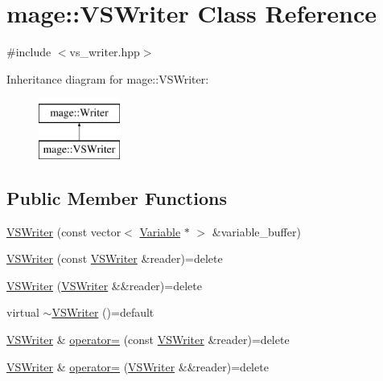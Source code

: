 \hypertarget{classmage_1_1_v_s_writer}{}\section{mage\+:\+:V\+S\+Writer Class Reference}
\label{classmage_1_1_v_s_writer}


{\ttfamily \#include $<$vs\+\_\+writer.\+hpp$>$}

Inheritance diagram for mage\+:\+:V\+S\+Writer\+:\begin{figure}[H]
\begin{center}
\leavevmode
\includegraphics[height=2.000000cm]{classmage_1_1_v_s_writer}
\end{center}
\end{figure}
\subsection*{Public Member Functions}
\begin{DoxyCompactItemize}
\item 
\hyperlink{classmage_1_1_v_s_writer_a401e3661cf197c20a011792221443e8f}{V\+S\+Writer} (const vector$<$ \hyperlink{structmage_1_1_variable}{Variable} $\ast$ $>$ \&variable\+\_\+buffer)
\item 
\hyperlink{classmage_1_1_v_s_writer_ac832695702725d55e8b5ded2917758d9}{V\+S\+Writer} (const \hyperlink{classmage_1_1_v_s_writer}{V\+S\+Writer} \&reader)=delete
\item 
\hyperlink{classmage_1_1_v_s_writer_a0ea80ce74f51eb63512b0fa13577bf30}{V\+S\+Writer} (\hyperlink{classmage_1_1_v_s_writer}{V\+S\+Writer} \&\&reader)=delete
\item 
virtual \hyperlink{classmage_1_1_v_s_writer_ac2268dde1a58f0d1d657e584e33e82fe}{$\sim$\+V\+S\+Writer} ()=default
\item 
\hyperlink{classmage_1_1_v_s_writer}{V\+S\+Writer} \& \hyperlink{classmage_1_1_v_s_writer_a3c961e3ef27f93b5ecf953c81844f6c6}{operator=} (const \hyperlink{classmage_1_1_v_s_writer}{V\+S\+Writer} \&reader)=delete
\item 
\hyperlink{classmage_1_1_v_s_writer}{V\+S\+Writer} \& \hyperlink{classmage_1_1_v_s_writer_a33859922757212edae1010fce699e3af}{operator=} (\hyperlink{classmage_1_1_v_s_writer}{V\+S\+Writer} \&\&reader)=delete
\end{DoxyCompactItemize}
